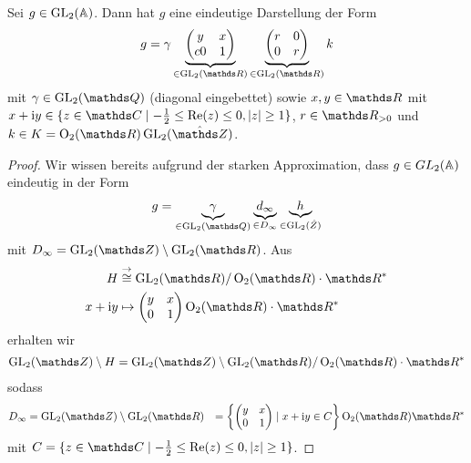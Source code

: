 \begin{prop}
Sei $g \in \operatorname{GL}_2(\mathbb{A})$. Dann hat $g$ eine eindeutige Darstellung der Form
\begin{align*}
g=\gamma \underbrace{\begin{pmatrix}
y&x\\
c0&1
\end{pmatrix}}_{\in \GL_2(\R)} \underbrace{\begin{pmatrix}
r&0\\
0&r
\end{pmatrix}}_{\in \GL_2(\R)} k
\end{align*}
mit $\gamma \in \GL_2(\Q)$ (diagonal eingebettet) sowie $x,y\in \R$
mit $x+\mathrm{i}y \in \{z \in \C \mid -\frac{1}{2} \leq \Ret(z) \leq 0, \abs{z}\geq 1\}$, $r \in \R_{>0}$ und $k\in K=\Oo_2(\R) \GL_2(\hat{\Z})$.
\end{prop}
\begin{proof}
Wir wissen bereits aufgrund der starken Approximation, dass $g \in GL_2(\mathbb{A})$ eindeutig in der Form
\begin{align*}
g=\underbrace{\gamma}_{\in \GL_2(\Q)} \underbrace{d_\infty}_{\in D_\infty} \underbrace{h}_{\in \GL_2(\hat{Z})}
\end{align*}
mit $D_\infty=\GL_2(\Z)\setminus \GL_2(\R)$.
Aus
\begin{align*}
H &\overset{\to}{\cong} \GL_2(\R) / \Oo_2(\R)\cdot \R^\ast\\
x+\mathrm{i}y &\mapsto \begin{pmatrix}
y&x\\
0&1
\end{pmatrix} \Oo_2(\R)\cdot \R^\ast
\end{align*}
erhalten wir
\begin{align*}
\GL_2(\Z)\setminus H =\GL_2(\Z) \setminus \GL_2(\R) / \Oo_2(\R)\cdot \R^\ast
\end{align*}
sodass 
\begin{align*}
D_\infty&=\GL_2(\Z) \setminus \GL_2(\R)
&=\left\lbrace \begin{pmatrix}
y&x\\
0&1
\end{pmatrix} \mid x+\mathrm{i}y \in C\right\rbrace \Oo_2(\R) \R^\ast
\end{align*}
mit $C=\{z \in \C \mid -\frac{1}{2}\leq  \Ret(z) \leq 0, \abs{z}\geq 1\}$.
\end{proof}

